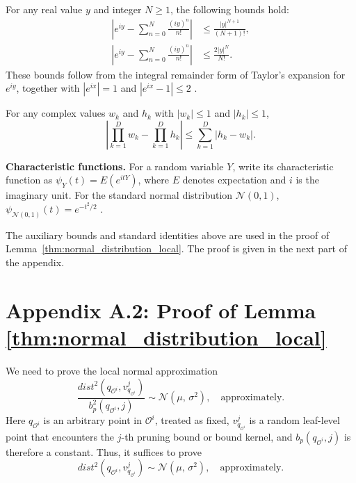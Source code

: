 \begin{lemma}\label{lm:min}
For any real value $y$ and integer $N\geq 1$, the following bounds hold:
\begin{align}
\left|e^{iy}-\sum^{N}_{n=0}\frac{(iy)^{n}}{n!}\right|
&\leq \frac{|y|^{N+1}}{(N+1)!}, \label{equ:min_11} \\
\left|e^{iy}-\sum^{N}_{n=0}\frac{(iy)^{n}}{n!}\right|
&\leq \frac{2|y|^{N}}{N!}. \label{equ:min_12}
\end{align}
These bounds follow from the integral remainder form of Taylor's expansion for $e^{iy}$, together with $|e^{ix}|=1$ and $|e^{ix}-1|\leq2$ \cite{durrett2019probability, teicher1978probability, chung2000course}.
\end{lemma}

\begin{lemma}\label{lm:complex_product_bound}
For any complex values $w_k$ and $h_k$ with $|w_k|\leq 1$ and $|h_k|\leq 1$,
\begin{equation}
\left| \prod_{k=1}^{D} w_k - \prod_{k=1}^{D} h_k \right|
\leq \sum_{k=1}^{D} |h_k - w_k| .
\label{equ:complex_value_multiply_sum}
\end{equation}
\end{lemma}

\noindent\textbf{Characteristic functions.}
For a random variable $Y$, write its characteristic function as
$\psi_Y(t)=E(e^{itY})$, where $E$ denotes expectation and $i$ is the
imaginary unit. For the standard normal distribution $\mathcal{N}(0,1)$,
$\psi_{\mathcal{N}(0,1)}(t)=e^{-t^2/2}$
\cite{durrett2019probability, teicher1978probability, chung2000course}.

The auxiliary bounds and standard identities above are used in the proof of Lemma~\ref{thm:normal_distribution_local}. The proof is given in the next part of the appendix.
\section*{Appendix A.2: Proof of Lemma \ref{thm:normal_distribution_local}}
We need to prove the local normal approximation
\begin{equation}
\frac{dist^2(q_{\mathcal{O}^i},v^{j}_{q_{\mathcal{O}^i}})}
{b_{p}^2(q_{\mathcal{O}^i},j)}
\sim \mathcal{N}(\mu,\,\sigma^2),\quad \text{approximately}.
\label{equ:normal_distribution_1}
\end{equation}
Here $q_{\mathcal{O}^i}$ is an arbitrary point in $\mathcal{O}^i$,
treated as fixed, $v^{j}_{q_{\mathcal{O}^i}}$ is a random leaf-level point
that encounters the $j$-th pruning bound or bound kernel, and
$b_p(q_{\mathcal{O}^i},j)$ is therefore a constant. Thus, it suffices to prove
\begin{equation}
dist^2(q_{\mathcal{O}^i},v^{j}_{q_{\mathcal{O}^i}})
\sim \mathcal{N}(\mu,\,\sigma^2),\quad \text{approximately}.
\label{equ:normal_distribution_2}
\end{equation}

